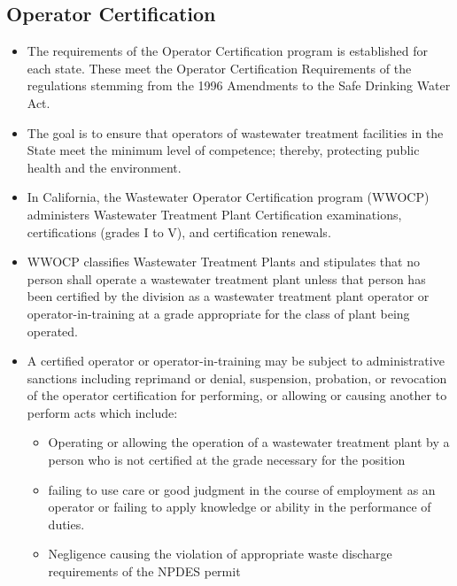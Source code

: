 \subsection{Operator Certification}
\begin{itemize}
\item The requirements of the Operator Certification program is established for each state.  These meet the Operator Certification Requirements of the regulations stemming from the 1996 Amendments to the Safe Drinking Water Act.
\item The goal is to ensure that operators of wastewater treatment facilities in the State meet the minimum level of competence; thereby, protecting public health and the environment.
\item In California, the Wastewater Operator Certification program (WWOCP) administers Wastewater Treatment Plant Certification examinations, certifications (grades I to V), and certification renewals. 
\item WWOCP classifies Wastewater Treatment Plants and stipulates that no person shall operate a wastewater treatment plant unless that person has been certified by the division as a wastewater treatment plant operator or operator-in-training at a grade appropriate for the class of plant being operated.
\item A certified operator or operator-in-training may be subject to administrative sanctions including reprimand or denial, suspension, probation, or revocation of the operator certification for performing, or allowing or causing another to perform acts which include:
\begin{itemize}
\item Operating or allowing the operation of a wastewater treatment plant by a person who is not certified at the grade necessary for the position
\item failing to use care or good judgment in the course of employment as an operator or failing to apply knowledge or ability in the performance of duties.
\item Negligence causing the violation of appropriate waste discharge requirements of the NPDES permit
\end{itemize}
\end{itemize}




